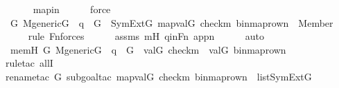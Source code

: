 \begin{isabellebody}
\ \ \ \ \isamarkupfalse%
\ mapin\isanewline
\ \ \ \ \isamarkupfalse%
\ force\isanewline
\isanewline
\ \ \isamarkupfalse%
\ {\isachardoublequoteopen}{\isasymforall}G{\isachardot}{\kern0pt}\ M{\isacharunderscore}{\kern0pt}generic{\isacharparenleft}{\kern0pt}G{\isacharparenright}{\kern0pt}\ {\isasymand}\ q\ {\isasymin}\ G\ {\isasymlongrightarrow}\ SymExt{\isacharparenleft}{\kern0pt}G{\isacharparenright}{\kern0pt}{\isacharcomma}{\kern0pt}\ map{\isacharparenleft}{\kern0pt}val{\isacharparenleft}{\kern0pt}G{\isacharparenright}{\kern0pt}{\isacharcomma}{\kern0pt}\ {\isacharbrackleft}{\kern0pt}check{\isacharparenleft}{\kern0pt}m{\isacharparenright}{\kern0pt}{\isacharcomma}{\kern0pt}\ binmap{\isacharunderscore}{\kern0pt}row{\isacharprime}{\kern0pt}{\isacharparenleft}{\kern0pt}n{\isacharparenright}{\kern0pt}{\isacharbrackright}{\kern0pt}{\isacharparenright}{\kern0pt}\ {\isasymTurnstile}\ Member{\isacharparenleft}{\kern0pt}{}{\isacharcomma}{\kern0pt}\ {}{\isacharparenright}{\kern0pt}{\isachardoublequoteclose}\ \isanewline
\ \ \ \ \isamarkupfalse%
{\isacharparenleft}{\kern0pt}rule\ Fn{\isacharunderscore}{\kern0pt}{}{\isacharunderscore}{\kern0pt}forces{\isacharparenright}{\kern0pt}\isanewline
\ \ \ \ \isamarkupfalse%
\ assms\ mH\ qinFn\ appn\isanewline
\ \ \ \ \isamarkupfalse%
\ auto\isanewline
\ \ \isamarkupfalse%
\ \isamarkupfalse%
\ memH{\isacharcolon}{\kern0pt}\ {\isachardoublequoteopen}{\isasymforall}G{\isachardot}{\kern0pt}\ M{\isacharunderscore}{\kern0pt}generic{\isacharparenleft}{\kern0pt}G{\isacharparenright}{\kern0pt}\ {\isasymand}\ q\ {\isasymin}\ G\ {\isasymlongrightarrow}\ val{\isacharparenleft}{\kern0pt}G{\isacharcomma}{\kern0pt}\ check{\isacharparenleft}{\kern0pt}m{\isacharparenright}{\kern0pt}{\isacharparenright}{\kern0pt}\ {\isasymin}\ val{\isacharparenleft}{\kern0pt}G{\isacharcomma}{\kern0pt}\ binmap{\isacharunderscore}{\kern0pt}row{\isacharprime}{\kern0pt}{\isacharparenleft}{\kern0pt}n{\isacharparenright}{\kern0pt}{\isacharparenright}{\kern0pt}{\isachardoublequoteclose}\isanewline
\ \ \ \ \isamarkupfalse%
{\isacharparenleft}{\kern0pt}rule{\isacharunderscore}{\kern0pt}tac\ allI{\isacharparenright}{\kern0pt}\isanewline
\ \ \ \ \isamarkupfalse%
{\isacharparenleft}{\kern0pt}rename{\isacharunderscore}{\kern0pt}tac\ G{\isacharcomma}{\kern0pt}\ subgoal{\isacharunderscore}{\kern0pt}tac\ {\isachardoublequoteopen}map{\isacharparenleft}{\kern0pt}val{\isacharparenleft}{\kern0pt}G{\isacharparenright}{\kern0pt}{\isacharcomma}{\kern0pt}\ {\isacharbrackleft}{\kern0pt}check{\isacharparenleft}{\kern0pt}m{\isacharparenright}{\kern0pt}{\isacharcomma}{\kern0pt}\ binmap{\isacharunderscore}{\kern0pt}row{\isacharprime}{\kern0pt}{\isacharparenleft}{\kern0pt}n{\isacharparenright}{\kern0pt}{\isacharbrackright}{\kern0pt}{\isacharparenright}{\kern0pt}\ {\isasymin}\ list{\isacharparenleft}{\kern0pt}SymExt{\isacharparenleft}{\kern0pt}G{\isacharparenright}{\kern0pt}{\isacharparenright}{\kern0pt}{\isachardoublequoteclose}{\isacharparenright}{\kern0pt}\isanewline

\end{isabellebody}
